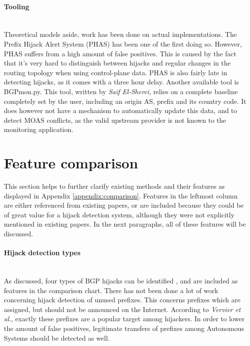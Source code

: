 \paragraph{Tooling}\label{par:tooling}\mbox{}\\
Theoretical models aside, work has been done on actual implementations\cite{lad2006phas}\cite{bgpmonsaif}. The Prefix Hijack Alert System (PHAS) has been one of the first doing so. However, PHAS suffers from a high amount of false positives\cite{zheng2007light}. This is caused by the fact that it's very hard to distinguish between hijacks and regular changes in the routing topology when using control-plane data\cite{vervier2015mind,shi2012detecting}. PHAS is also fairly late in detecting hijacks, as it comes with a three hour delay\cite{lad2006phas}. Another available tool is BGPmon.py\cite{bgpmonsaif}. This tool, written by \emph{Saif El-Sherei}, relies on a complete baseline completely set by the user, including an origin AS, prefix and its country code. It does however not have a mechanism to automatically update this data, and to detect MOAS conflicts, as the valid upstream provider is not known to the monitoring application.

\section{Feature comparison}\label{sec:comparison}
This section helps to further clarify existing methods and their features as displayed in Appendix \ref{appendix:comparison}. Features in the leftmost column are either referenced from existing papers, or are included because they could be of great value for a hijack detection system, although they were not explicitly mentioned in existing papers. In the next paragraphs, all of these features will be discussed.

\paragraph{Hijack detection types}\label{par:hijackdetectiontypes}\mbox{}\\
As discussed, four types of BGP hijacks can be identified \cite{hu2007accurate}, and are included as features in the comparison chart. There has not been done a lot of work concerning hijack detection of unused prefixes. This concerns prefixes which are assigned, but should not be announced on the Internet. According to \emph{Vervier et al.}, exactly these prefixes are a popular target among hijackers\cite{vervier2015mind}. In order to lower the amount of false positives, legitimate transfers of prefixes among Autonomous Systems should be detected as well\cite{zhao2001analysis}.

